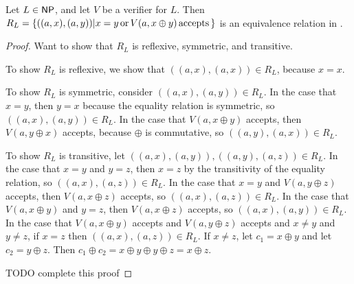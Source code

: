 \begin{lemma}\label{lem:rl_eq_rel}Let $L\in{\ensuremath{\mathsf{NP}}}$, and let $V$ be a verifier for
  $L$. Then $R_L=\{((a,x),(a,y))|x=y\,\text{or}\,V(a,x\oplus y)\,\text{accepts}\,\}$
  is an equivalence relation in \PEq.\end{lemma}
\begin{proof}Want to show that $R_L$ is reflexive, symmetric, and transitive.
  
  To show $R_L$ is reflexive, we show that $((a,x),(a,x))\in R_L$, because
  $x=x$.

  To show $R_L$ is symmetric, consider $((a,x),(a,y))\in R_L$. In the case that
  $x=y$, then $y=x$ because the equality relation is symmetric, so
  $((a,x),(a,y))\in R_L$. In the case that $V(a,x\oplus y)$ accepts, then
  $V(a,y\oplus x)$ accepts, because $\oplus$ is commutative, so
  $((a,y),(a,x))\in R_L$.

  To show $R_L$ is transitive, let $((a,x),(a,y)),((a,y),(a,z))\in R_L$. In the
  case that $x=y$ and $y=z$, then $x=z$ by the transitivity of the equality
  relation, so $((a,x),(a,z))\in R_L$. In the case that $x=y$ and $V(a, y\oplus
  z)$ accepts, then $V(a, x\oplus z)$ accepts, so $((a,x),(a,z))\in R_L$. In
  the case that $V(a, x\oplus y)$ and $y=z$, then $V(a, x\oplus z)$ accepts, so
  $((a,x), (a,y))\in R_L$. In the case that $V(a, x\oplus y)$ accepts and $V(a,
  y\oplus z)$ accepts and $x\neq y$ and $y\neq z$, if $x=z$ then
  $((a,x),(a,z))\in R_L$. If $x\neq z$, let $c_1=x\oplus y$ and let
  $c_2=y\oplus z$. Then $c_1\oplus c_2=x\oplus y\oplus y\oplus z=x\oplus z$.

  TODO complete this proof
\end{proof}

